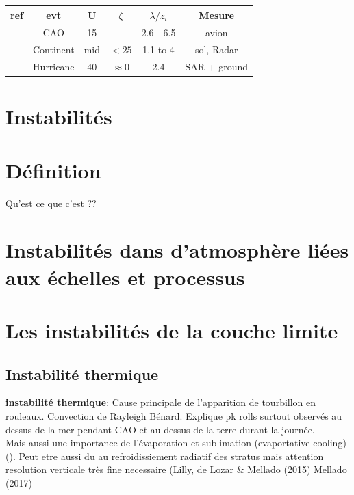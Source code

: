 \begin{table}[h!]
	\begin{tabular}{c||c ||c|c|c|c}
		ref                                            & evt       & U & $\zeta$     & $\lambda / z_i$ &  Mesure\\
		\hline \hline			
		\cite{brummerRollCellConvection1999}           & CAO       & 15  &           & 2.6 - 6.5       & avion\\
		\cite{weckwerthObservationalStudyEvolution1999}& Continent & mid &$<25$      & 1.1 to 4        & sol, Radar\\
		\cite{foster2005}                              & Hurricane & 40  &$\approx 0$& 2.4             & SAR + ground
	\end{tabular}
\end{table}



\section{Instabilités}


\section{Définition}
Qu'est ce que c'est ??

\section{Instabilités dans d’atmosphère liées aux échelles et processus}

\section{Les instabilités de la couche limite}
\subsection{Instabilité thermique}
\textbf{instabilité thermique}: Cause principale de l'apparition de tourbillon en rouleaux. Convection de Rayleigh Bénard. Explique pk rolls surtout observés au dessus de la mer pendant CAO et au dessus de la terre durant la journée.\\

Mais aussi une importance de l'évaporation et sublimation (evaportative cooling) (\cite{riviereDownwardTransportMomentum2020}). Peut etre aussi du au refroidissiement radiatif des stratus mais attention resolution verticale très fine necessaire (Lilly, de Lozar \& Mellado (2015) Mellado (2017)
